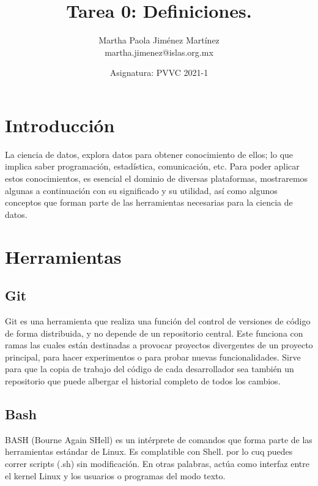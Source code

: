 \documentclass[12pt,letterpaper]{article}
\begin{document}
\title{\textbf{Tarea 0: Definiciones.}} \author{Martha Paola Jiménez
Martínez \\
\small{martha.jimenez@islas.org.mx}}
\date{ \small{Asignatura: PVVC 2021-1}
} 
\maketitle


\section*{Introducción}
La ciencia de datos, explora datos para obtener conocimiento de ellos; lo que implica saber programación, estadística, comunicación, etc. Para poder aplicar estos conocimientos, es esencial el dominio de diversas plataformas, mostraremos algunas a continuación con su significado y su utilidad, así como algunos conceptos que forman parte de las herramientas necesarias para la ciencia de datos.

\section*{Herramientas}
\subsection*{Git}
Git es una herramienta que realiza una función del control de versiones de
código de forma distribuida, y no depende de un repositorio central. Este
funciona con ramas las cuales están destinadas a provocar proyectos divergentes
de un proyecto principal, para hacer experimentos o para probar nuevas
funcionalidades.
\citep{rubio_2020}
Sirve para que la copia de trabajo del código de cada desarrollador sea también
un repositorio que puede albergar el historial completo de todos los cambios.
\citep{bitbucket_git}

\subsection*{Bash}
BASH (Bourne Again SHell) es un intérprete de comandos que forma parte de las herramientas estándar de Linux. Es complatible con Shell. por lo cuq puedes correr scripts (.sh) sin modificación. En otras palabras, actúa como interfaz entre el kernel Linux y los usuarios o programas del modo texto.
\citep{canepa_2018}
\end{document}
